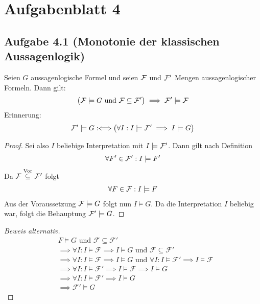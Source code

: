 
\section{Aufgabenblatt 4}
\subsection{Aufgabe 4.1 (Monotonie der klassischen Aussagenlogik)}
Seien $G$ aussagenlogische Formel und seien $\mathcal{F}$ und $\mathcal{F}'$
Mengen aussagenlogischer Formeln. 
Dann gilt:
\begin{align*}
	\big(\mathcal{F}\models G\text{ und } \mathcal{F}\subseteq\mathcal{F}'\big)\implies\mathcal{F}'\models\mathcal{F}
\end{align*}
Erinnerung:
\begin{align*}
	\mathcal{F}'\models G:\Longleftrightarrow\big(\forall I:I\models\mathcal{F}'\implies I\models G\big)
\end{align*}

\begin{proof}
	Sei also $I$ beliebige Interpretation mit $I\models\mathcal{F}'$. 
	Dann gilt nach Definition
	\begin{align*}
		\forall F'\in\mathcal{F}':I\models F'
	\end{align*}
	Da $\mathcal{F}\stackrel{\text{Vor}}{\subseteq}\mathcal{F}'$ folgt 
	\begin{align*}
		\forall F\in\mathcal{F}:I\models F
	\end{align*}
	Aus der Voraussetzung $\mathcal{F}\models G$ folgt nun $I\models G$. 
	Da die Interpretation $I$ beliebig war, folgt die Behauptung $\mathcal{F}'\models G$. 
\end{proof}
\begin{proof}[Beweis alternativ]
	\begin{align*}
		& F \models G \text{ und } \mathcal{F} \subseteq \mathcal{F}'\\
		& \implies \forall I : I \models \mathcal{F} \implies I \models G \text{ und } \mathcal{F} \subseteq \mathcal{F}'\\
		& \implies \forall I : I \models \mathcal{F} \implies I \models G \text{ und } \forall I : I \models \mathcal{F}' \implies I \models \mathcal{F}\\
		& \implies \forall I : I \models \mathcal{F}' \implies I \models \mathcal{F} \implies I \models G\\
		& \implies \forall I : I \models \mathcal{F}' \implies I \models G\\
		& \implies \mathcal{F}' \models G
	\end{align*}
\end{proof}

